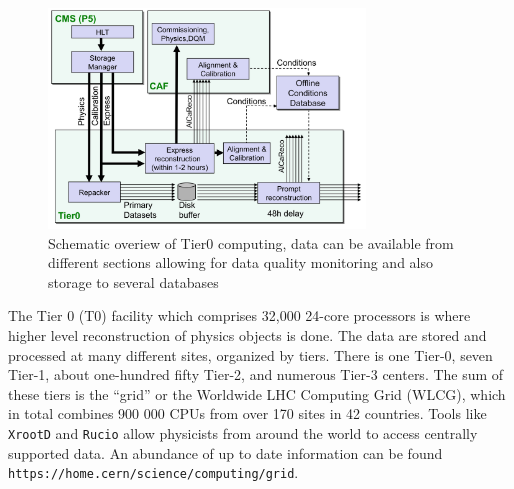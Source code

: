 \begin{figure}[ht!b]
  \centering
\includegraphics[width=0.75\textwidth]{figures/Tier0.png}    
    \caption{\label{fig:t0} Schematic overiew of Tier0 computing, data can be available from different sections allowing for data quality monitoring and also storage to several databases ~\cite{Hufnagel:1319049} }
\end{figure}

The Tier 0 (T0) facility which comprises 32,000 24-core processors is where higher level reconstruction of physics objects is done.  
The data are stored and processed at many different sites, organized by tiers. There is one Tier-0, seven Tier-1, about one-hundred fifty Tier-2, and numerous Tier-3 centers. The sum of these tiers is the ``grid'' or the Worldwide LHC Computing Grid (WLCG), which in total combines 900 000 CPUs from over 170 sites in 42 countries. Tools like \texttt{XrootD} and \texttt{Rucio} allow physicists from around the world to access centrally supported data. An abundance of up to date information can be found \texttt{https://home.cern/science/computing/grid}. 



